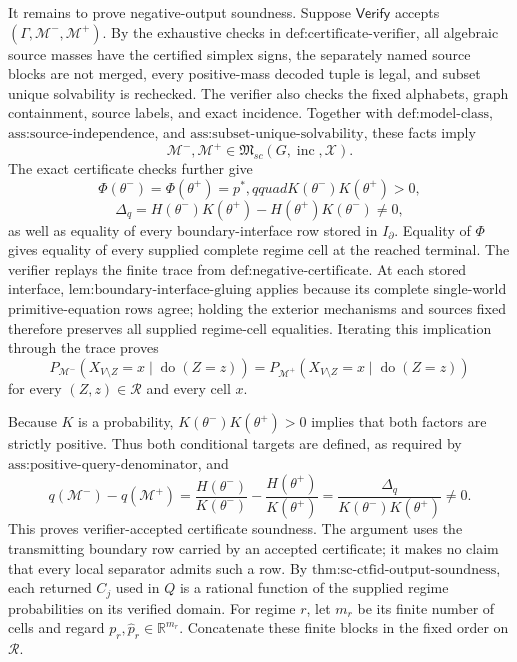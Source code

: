 It remains to prove negative-output soundness.  Suppose \(\mathsf{Verify}\) accepts \((\Gamma,\mathcal M^-,\mathcal M^+)\).  By the exhaustive checks in \(\text{def:certificate-verifier}\), all algebraic source masses have the certified simplex signs, the separately named source blocks are not merged, every positive-mass decoded tuple is legal, and subset unique solvability is rechecked.  The verifier also checks the fixed alphabets, graph containment, source labels, and exact incidence.  Together with \(\text{def:model-class}\), \(\text{ass:source-independence}\), and \(\text{ass:subset-unique-solvability}\), these facts imply
\[
 \mathcal M^-,\mathcal M^+
 \in\mathfrak M_{sc}(G,\operatorname{inc},\mathcal X).
\]
The exact certificate checks further give
\[
 \Phi(\theta^-)=\Phi(\theta^+)=p^*,qquad
 K(\theta^-)K(\theta^+)>0,
\]
\[
 \Delta_q
 =H(\theta^-)K(\theta^+)-H(\theta^+)K(\theta^-)
 \ne0,
\]
as well as equality of every boundary-interface row stored in \(I_{\partial}\).  Equality of \(\Phi\) gives equality of every supplied complete regime cell at the reached terminal.  The verifier replays the finite trace from \(\text{def:negative-certificate}\).  At each stored interface, \(\text{lem:boundary-interface-gluing}\) applies because its complete single-world primitive-equation rows agree; holding the exterior mechanisms and sources fixed therefore preserves all supplied regime-cell equalities.  Iterating this implication through the trace proves
\[
 P_{\mathcal M^-}(X_{V\setminus Z}=x\mid\operatorname{do}(Z=z))
 =P_{\mathcal M^+}(X_{V\setminus Z}=x\mid\operatorname{do}(Z=z))
\]
for every \((Z,z)\in\mathcal R\) and every cell \(x\).

Because \(K\) is a probability, \(K(\theta^-)K(\theta^+)>0\) implies that both factors are strictly positive.  Thus both conditional targets are defined, as required by \(\text{ass:positive-query-denominator}\), and
\[
 q(\mathcal M^-)-q(\mathcal M^+)
 =\frac{H(\theta^-)}{K(\theta^-)}
  -\frac{H(\theta^+)}{K(\theta^+)}
 =\frac{\Delta_q}{K(\theta^-)K(\theta^+)}\ne0.
\]
This proves verifier-accepted certificate soundness.  The argument uses the transmitting boundary row carried by an accepted certificate; it makes no claim that every local separator admits such a row.
By \(\text{thm:sc-ctfid-output-soundness}\), each returned \(C_j\) used in \(Q\) is a rational function of the supplied regime probabilities on its verified domain.  For regime \(r\), let \(m_r\) be its finite number of cells and regard \(p_r,\widehat p_r\in\mathbb R^{m_r}\).  Concatenate these finite blocks in the fixed order on \(\mathcal R\).


